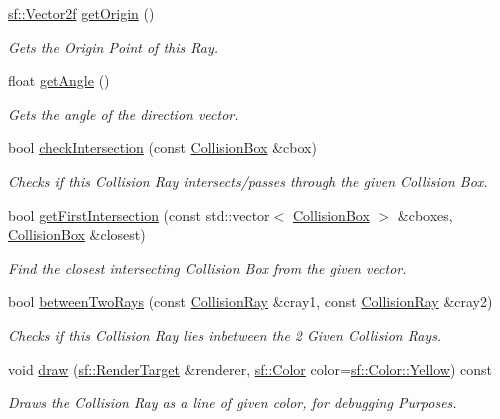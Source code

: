 \begin{DoxyCompactItemize}
\mbox{\label{class_collision_ray_abe9aae4f46cd60281b0c884953b714d3}} 
\mbox{\hyperlink{classsf_1_1_vector2}{sf\+::\+Vector2f}} \mbox{\hyperlink{class_collision_ray_abe9aae4f46cd60281b0c884953b714d3}{get\+Origin}} ()
\begin{DoxyCompactList}\small\item\em Gets the Origin Point of this Ray. \end{DoxyCompactList}\item 
\mbox{\label{class_collision_ray_a4997016dacd06e73b3963daa5d6d9b09}} 
float \mbox{\hyperlink{class_collision_ray_a4997016dacd06e73b3963daa5d6d9b09}{get\+Angle}} ()
\begin{DoxyCompactList}\small\item\em Gets the angle of the direction vector. \end{DoxyCompactList}\item 
bool \mbox{\hyperlink{class_collision_ray_a3c753a24a3c0af416af7c636240e9c6f}{check\+Intersection}} (const \mbox{\hyperlink{class_collision_box}{Collision\+Box}} \&cbox)
\begin{DoxyCompactList}\small\item\em Checks if this Collision Ray intersects/passes through the given Collision Box. \end{DoxyCompactList}\item 
bool \mbox{\hyperlink{class_collision_ray_a78392e1149da5bdf0e1de296069697c2}{get\+First\+Intersection}} (const std\+::vector$<$ \mbox{\hyperlink{class_collision_box}{Collision\+Box}} $>$ \&cboxes, \mbox{\hyperlink{class_collision_box}{Collision\+Box}} \&closest)
\begin{DoxyCompactList}\small\item\em Find the closest intersecting Collision Box from the given vector. \end{DoxyCompactList}\item 
bool \mbox{\hyperlink{class_collision_ray_a124b6b1e91a95aa91eaa928a6783a3f6}{between\+Two\+Rays}} (const \mbox{\hyperlink{class_collision_ray}{Collision\+Ray}} \&cray1, const \mbox{\hyperlink{class_collision_ray}{Collision\+Ray}} \&cray2)
\begin{DoxyCompactList}\small\item\em Checks if this Collision Ray lies \textquotesingle{}inbetween\textquotesingle{} the 2 Given Collision Rays. \end{DoxyCompactList}\item 
void \mbox{\hyperlink{class_collision_ray_affac73ba205d0015b2de2ca12cd1111c}{draw}} (\mbox{\hyperlink{classsf_1_1_render_target}{sf\+::\+Render\+Target}} \&renderer, \mbox{\hyperlink{classsf_1_1_color}{sf\+::\+Color}} color=\mbox{\hyperlink{classsf_1_1_color_af8896b5f56650935f5b9d72d528802c7}{sf\+::\+Color\+::\+Yellow}}) const
\begin{DoxyCompactList}\small\item\em Draws the Collision Ray as a line of given color, for debugging Purposes. \end{DoxyCompactList}\end{DoxyCompactItemize}
